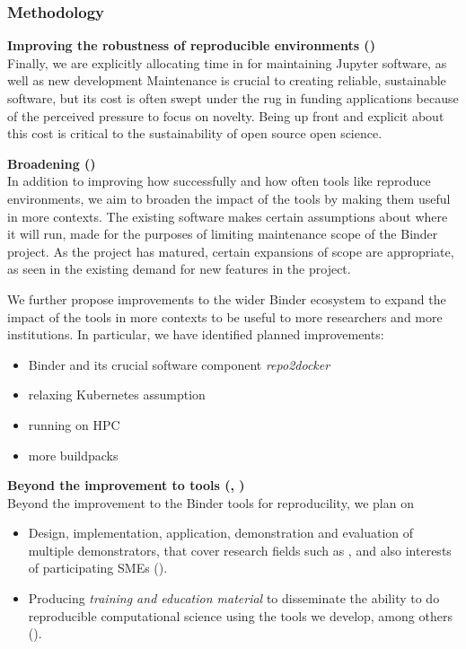 
\subsubsection{Methodology}\label{sec:methodology}

\textbf{Improving the robustness of reproducible environments ()}\\
Finally, we are explicitly allocating time in  for maintaining
Jupyter software, as well as new development
Maintenance is crucial to creating reliable, sustainable software,
but its cost is often swept under the rug in funding applications
because of the perceived pressure to focus on novelty.
Being up front and explicit about this cost is critical to the sustainability
of open source open science.

\medskip
\noindent\textbf{Broadening  ()}\\
In addition to improving how successfully and how often tools like \repotodocker{} reproduce environments,
we aim to broaden the impact of the tools by making them useful in more contexts.
The existing software makes certain assumptions about where it will run,
made for the purposes of limiting maintenance scope of the Binder project.
As the project has matured, certain expansions of scope are appropriate,
as seen in the existing demand for new features in the project.

We further propose improvements to the wider Binder ecosystem
to expand the impact of the tools in more contexts to be useful to more researchers
and more institutions.
In particular, we have identified planned improvements:

\begin{itemize}
  \item Binder and its crucial software component \emph{repo2docker}
  \item relaxing Kubernetes assumption
  \item running on HPC
  \item more buildpacks

\end{itemize}

\medskip\noindent\textbf{Beyond the improvement to \TheProject tools
  (, )}\\
Beyond the improvement to the Binder tools for reproducility, we plan on
\begin{itemize}
\item Design, implementation, application, demonstration and
  evaluation of multiple demonstrators, that cover research fields such as
  ,
  and also interests of participating SMEs ().
\item Producing \emph{training and education material} to disseminate
  the ability to do reproducible computational science using the tools
  we develop, among others ().
\end{itemize}

